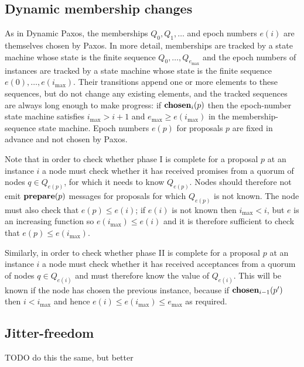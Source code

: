 \documentclass[journal]{IEEEtran}
\begin{document}
\subsection{Dynamic membership changes}

As in Dynamic Paxos, the memberships $Q_0, Q_1, \ldots$ and epoch numbers
$e(i)$ are themselves chosen by Paxos. In more detail, memberships are tracked
by a state machine whose state is the finite sequence $Q_0, \ldots,
Q_{e_\mathrm{max}}$ and the epoch numbers of instances are tracked by a state
machine whose state is the finite sequence $e(0), \ldots, e(i_\mathrm{max})$.
Their transitions append one or more elements to these sequences, but do not
change any existing elements, and the tracked sequences are always long enough
to make progress: if $\mathbf{chosen}_{i}(p)$ then the epoch-number state machine
satisfies $i_\mathrm{max} > i+1$ and $e_\mathrm{max} \ge e(i_\mathrm{max})$ in
the membership-sequence state machine. Epoch numbers $e(p)$ for proposals $p$
are fixed in advance and not chosen by Paxos.

Note that in order to check whether phase I is complete for a proposal $p$ at
an instance $i$ a node must check whether it has received promises from a
quorum of nodes $q \in Q_{e(p)}$, for which it needs to know $Q_{e(p)}$.  Nodes
should therefore not emit $\mathbf{prepare}(p)$ messages for proposals for which
$Q_{e(p)}$ is not known. The node must also check that $e(p) \le e(i)$; if
$e(i)$ is not known then $i_\mathrm{max} < i$, but $e$ is an increasing
function so $e(i_\mathrm{max}) \le e(i)$ and it is therefore sufficient to
check that $e(p) \le e(i_\mathrm{max})$.

Similarly, in order to check whether phase II is complete for a proposal $p$ at
an instance $i$ a node must check whether it has received acceptances from a
quorum of nodes $q \in Q_{e(i)}$ and must therefore know the value of
$Q_{e(i)}$. This will be known if the node has chosen the previous instance,
because if $\mathbf{chosen}_{i-1}(p')$ then $i < i_\mathrm{max}$ and hence ${e(i) \le
e(i_\mathrm{max}) \le e_\mathrm{max}}$ as required.

\subsection{Jitter-freedom}

TODO do this the same, but better
\end{document}
